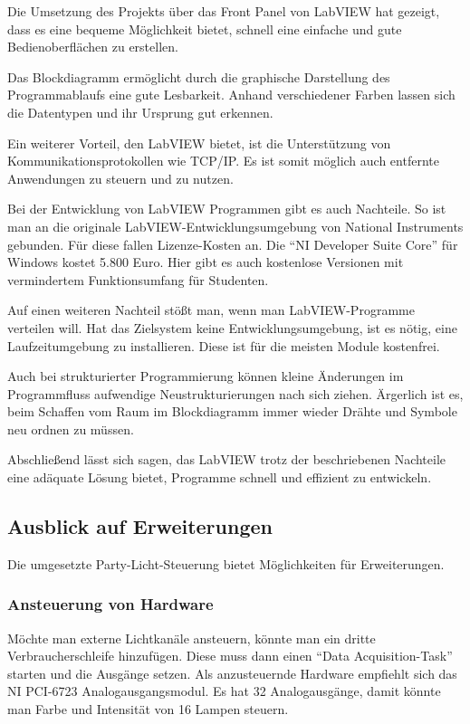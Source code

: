 Die Umsetzung des Projekts über das Front Panel von LabVIEW hat gezeigt, dass es eine bequeme Möglichkeit bietet, schnell eine einfache und  gute Bedienoberflächen zu erstellen.


Das Blockdiagramm ermöglicht durch die graphische Darstellung des Programmablaufs eine gute Lesbarkeit.
Anhand verschiedener Farben lassen sich die Datentypen und ihr Ursprung gut erkennen.

Ein weiterer Vorteil, den LabVIEW bietet, ist die Unterstützung von Kommunikationsprotokollen wie TCP/IP. 
Es ist somit möglich auch  entfernte Anwendungen zu steuern und zu nutzen.

Bei der Entwicklung von LabVIEW Programmen gibt es auch Nachteile.
So ist man an die originale LabVIEW-Entwicklungsumgebung von National Instruments gebunden. 
Für diese fallen Lizenze-Kosten an. Die "`NI Developer Suite Core"' für Windows kostet 5.800 Euro.
Hier gibt es auch kostenlose Versionen mit vermindertem Funktionsumfang für Studenten. \cite{ni-kost}

Auf einen weiteren Nachteil stößt man, wenn man LabVIEW-Programme verteilen will. Hat das Zielsystem keine Entwicklungsumgebung, ist es nötig, eine Laufzeitumgebung zu installieren.
Diese ist für die meisten Module kostenfrei.

Auch bei strukturierter Programmierung können kleine Änderungen im Programmfluss  aufwendige Neustrukturierungen nach sich ziehen. 
Ärgerlich ist es, beim Schaffen vom Raum im Blockdiagramm immer wieder Drähte und Symbole neu ordnen zu müssen.

Abschließend lässt sich sagen, das LabVIEW trotz der beschriebenen Nachteile eine adäquate Lösung bietet, Programme schnell und effizient zu entwickeln. %


	
\subsection{Ausblick auf Erweiterungen}
Die umgesetzte Party-Licht-Steuerung bietet Möglichkeiten für Erweiterungen.

\subsubsection{Ansteuerung von Hardware}
Möchte man externe Lichtkanäle ansteuern, könnte man ein dritte Verbraucherschleife hinzufügen. 
Diese muss dann einen "`Data Acquisition-Task"' starten und die Ausgänge setzen. 
Als anzusteuernde Hardware empfiehlt sich das NI PCI-6723 Analogausgangsmodul. 
Es hat 32 Analogausgänge, damit könnte man  Farbe und Intensität von 16 Lampen steuern.\cite{ni-pci}

